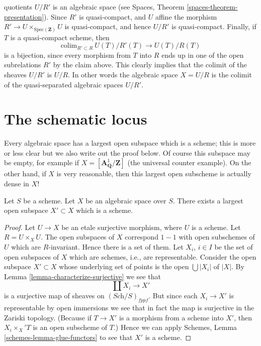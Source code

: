 \begin{remark}
quotients $U/R'$ is an algebraic space
(see Spaces, Theorem \ref{spaces-theorem-presentation}).
Since $R'$ is quasi-compact, and $U$ affine the morphism
$R' \to U \times_{\text{Spec}(\mathbf{Z})} U$ is quasi-compact,
and hence $U/R'$ is quasi-compact. Finally, if $T$ is a quasi-compact
scheme, then
$$
\text{colim}_{R' \subset R}\ U(T)/R'(T) \longrightarrow U(T)/R(T)
$$
is a bijection, since every morphism from $T$ into $R$ ends up in one
of the open subrelations $R'$ by the claim above. This clearly implies
that the colimit of the sheaves $U/R'$ is $U/R$. In other words
the algebraic space $X = U/R$ is the colimit of the quasi-separated
algebraic spaces $U/R'$.
\end{remark}







\section{The schematic locus}
\label{section-schematic}

\noindent
Every algebraic space has a largest open subspace which is a
scheme; this is more or less clear but we also write out the proof below.
Of course this subspace may be empty, for example if
$X = [\mathbf{A}^1_{\mathbf{Q}}/\mathbf{Z}]$ (the universal
counter example). On the other hand, if $X$ is very reasonable, then
this largest open subscheme is actually dense in $X$!

\begin{lemma}
\label{lemma-subscheme}
Let $S$ be a scheme.
Let $X$ be an algebraic space over $S$.
There exists a largest open subspace $X' \subset X$ which is a scheme.
\end{lemma}

\begin{proof}
Let $U \to X$ be an etale surjective morphism, where $U$ is a scheme.
Let $R = U \times_X U$. The open subspaces of $X$ correspond $1 - 1$
with open subschemes of $U$ which are $R$-invariant. Hence there is a
set of them. Let $X_i$, $i \in I$ be the set of open subspaces
of $X$ which are schemes, i.e., are representable. Consider the
open subspace $X' \subset X$ whose underlying set of points is
the open $\bigcup |X_i|$ of $|X|$. By
Lemma \ref{lemma-characterize-surjective}
we see that
$$
\coprod X_i \longrightarrow X'
$$
is a surjective map of sheaves on $(\textit{Sch}/S)_{fppf}$.
But since each $X_i \to X'$ is representable by open immersions
we see that in fact the map is surjective in the Zariski
topology. (Because if $T \to X'$ is a morphism from a scheme
into $X'$, then $X_i \times_X' T$ is an open subscheme of $T$.)
Hence we can apply
Schemes, Lemma \ref{schemes-lemma-glue-functors}
to see that $X'$ is a scheme.
\end{proof}

